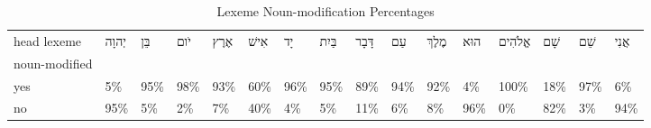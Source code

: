 \begin{table}[htbp!]
\centering
\caption{Lexeme Noun-modification Percentages}
\label{table:all_nounmod_pc}
\begin{adjustbox}{width=1\textwidth}
\begin{tabular}{llllllllllllllll}
\toprule
head lexeme & \texthebrew{יְהוָה} & \texthebrew{בֵּן} & \texthebrew{יֹום} & \texthebrew{אֶרֶץ} & \texthebrew{אִישׁ} & \texthebrew{יָד} & \texthebrew{בַּיִת} & \texthebrew{דָּבָר} & \texthebrew{עַם} & \texthebrew{מֶלֶךְ} & \texthebrew{הוּא} & \texthebrew{אֱלֹהִים} & \texthebrew{שָׁם} & \texthebrew{שֵׁם} & \texthebrew{אֲנִי} \\
noun-modified &                     &                   &                   &                    &                    &                  &                     &                     &                  &                     &                   &                       &                   &                   &                    \\
\midrule
yes           &                  5\% &               95\% &               98\% &                93\% &                60\% &              96\% &                 95\% &                 89\% &              94\% &                 92\% &                4\% &                  100\% &               18\% &               97\% &                 6\% \\
no            &                 95\% &                5\% &                2\% &                 7\% &                40\% &               4\% &                  5\% &                 11\% &               6\% &                  8\% &               96\% &                    0\% &               82\% &                3\% &                94\% \\
\bottomrule
\end{tabular}
\end{adjustbox}
\end{table}
